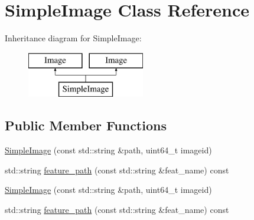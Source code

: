 \hypertarget{classSimpleImage}{\section{Simple\-Image Class Reference}
\label{classSimpleImage}
}
Inheritance diagram for Simple\-Image\-:\begin{figure}[H]
\begin{center}
\leavevmode
\includegraphics[height=2.000000cm]{classSimpleImage}
\end{center}
\end{figure}
\subsection*{Public Member Functions}
\begin{DoxyCompactItemize}
\item 
\hyperlink{classSimpleImage_af0fb8cbec292ba975b6c3d25ed6f185e}{Simple\-Image} (const std\-::string \&path, uint64\-\_\-t imageid)
\item 
std\-::string \hyperlink{classSimpleImage_a0702c5366f545d3b44a7ecfb900932ac}{feature\-\_\-path} (const std\-::string \&feat\-\_\-name) const 
\item 
\hyperlink{classSimpleImage_af0fb8cbec292ba975b6c3d25ed6f185e}{Simple\-Image} (const std\-::string \&path, uint64\-\_\-t imageid)
\item 
std\-::string \hyperlink{classSimpleImage_a0702c5366f545d3b44a7ecfb900932ac}{feature\-\_\-path} (const std\-::string \&feat\-\_\-name) const 
\end{DoxyCompactItemize}
